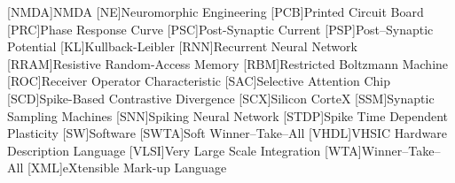 [NMDA]{NMDA}
[NE]{Neuromorphic Engineering}
[PCB]{Printed Circuit Board}
[PRC]{Phase Response Curve}
[PSC]{Post-Synaptic Current}
[PSP]{Post--Synaptic Potential}
[KL]{Kullback-Leibler}
[RNN]{Recurrent Neural Network}
[RRAM]{Resistive Random-Access Memory}
[RBM]{Restricted Boltzmann Machine}
[ROC]{Receiver Operator Characteristic}
[SAC]{Selective Attention Chip}
[SCD]{Spike-Based Contrastive Divergence}
[SCX]{Silicon CorteX}
[SSM]{Synaptic Sampling Machines}
[SNN]{Spiking Neural Network}
[STDP]{Spike Time Dependent Plasticity}
[SW]{Software}
[SWTA]{Soft Winner--Take--All}
[VHDL]{VHSIC Hardware Description Language}
[VLSI]{Very  Large  Scale  Integration}
[WTA]{Winner--Take--All}
[XML]{eXtensible Mark-up Language}
